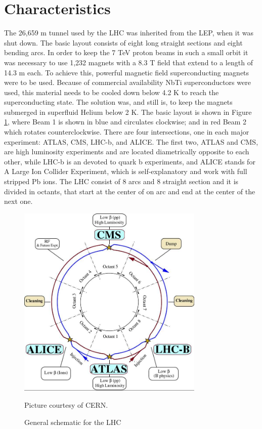 \section{Characteristics}
The 26,659 m tunnel used by the LHC was inherited from the LEP, when it was shut down. The basic layout consists of eight long straight sections and eight bending arcs\citep{keil}. In order to keep the 7 TeV proton beams in such a small orbit it was necessary to use 1,232 magnets with a 8.3 T field that extend to a length of 14.3 m each\citep{DR}. To achieve this, powerful magnetic field superconducting magnets were to be used. Because of commercial availability NbTi superconductors were used, this material needs to be cooled down below 4.2 K to reach the superconducting state.
The solution was, and still is, to keep the magnets submerged in superfluid Helium below 2 K\citep{keil}.
The basic layout is shown in Figure \ref{Schem}, where Beam 1 is shown in blue and circulates clockwise; and in red Beam 2 which  rotates counterclockwise. There are four intersections, one in each major experiment: ATLAS, CMS, LHC-b, and ALICE. The first two, ATLAS and CMS, are high luminosity experiments and are located diametrically opposite to each other, while LHC-b is an devoted to quark b experiments, and ALICE stands for A Large Ion Collider Experiment, which is self-explanatory and work with full stripped Pb ions. The LHC consist of 8 arcs and 8 straight section and it is divided in octants, that start at the center of on arc and end at the center of the next one\citep{DR}. 
\begin{figure}
	\centering
  \begin{minipage}{\textwidth}
  	\centering
   	\includegraphics[width=3.5in]{Pictures/imagen.jpg}
  		\caption{\label{Schem}
   			General schematic for the LHC}
   			\footnotesize{Picture courtesy of CERN.}
   \end{minipage}
\end{figure}
